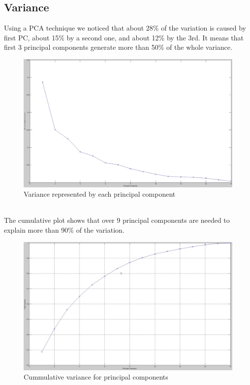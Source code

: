 \subsection*{Variance}
Using a PCA technique we noticed that about 28\% of the variation is caused by
first PC, about 15\% by a second one, and about 12\% by the 3rd. It means that
first 3 principal components generate more than 50\% of the whole variance. 
\begin{figure}[!tbh]
	\centering
	\includegraphics[width=1\textwidth]{figures/variance_perpc}
	\caption{Variance represented by each principal component}
	\label{fig:variance_perpc}
\end{figure} \\
The cumulative plot shows that over 9 principal components are needed to explain 
more than 90\% of the variation.
\begin{figure}[!tbh]
	\centering
	\includegraphics[width=1\textwidth]{figures/variance_cummulated}
	\caption{Cummulative variance for principal components}
	\label{fig:boxplot_cummulated}
\end{figure}
\clearpage
